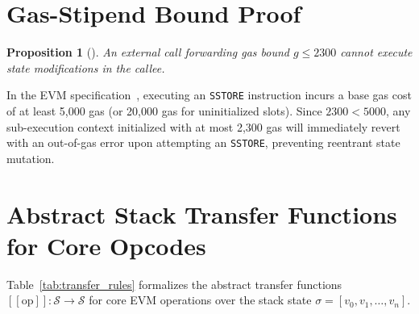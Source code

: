 \documentclass[conference]{IEEEtran}
\providecommand{\llbracket}{[\![}
\providecommand{\rrbracket}{]\!]}
\newtheorem{prop}{Proposition}
\newenvironment{proposition}[1][]{\begin{prop}[#1]\upshape}{\end{prop}}
\begin{document}
\section{Gas-Stipend Bound Proof}\label{app:gas_proof}
\begin{proposition}
An external call forwarding gas bound $g \le 2300$ cannot execute state modifications in the callee.
\end{proposition}
\begin{IEEEproof}
In the EVM specification~\cite{wood2014ethereum}, executing an \texttt{SSTORE} instruction incurs a base gas cost of at least 5,000 gas (or 20,000 gas for uninitialized slots). Since $2300 < 5000$, any sub-execution context initialized with at most 2,300 gas will immediately revert with an out-of-gas error upon attempting an \texttt{SSTORE}, preventing reentrant state mutation.
\end{IEEEproof}

\section{Abstract Stack Transfer Functions for Core Opcodes}\label{app:transfer_functions}
Table~\ref{tab:transfer_rules} formalizes the abstract transfer functions $\llbracket \mathrm{op} \rrbracket : \mathcal{S} \to \mathcal{S}$ for core EVM operations over the stack state $\sigma = [v_0, v_1, \dots, v_n]$.

\begin{table}[h]
\centering
\small
\renewcommand{\arraystretch}{1.12}
\caption{Abstract Stack Transfer Functions for Core EVM Opcodes}
\label{tab:transfer_rules}
\end{table}
\end{document}
